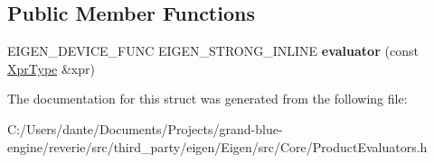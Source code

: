 \subsection*{Public Member Functions}
\begin{DoxyCompactItemize}
\item 
\mbox{\label{struct_eigen_1_1internal_1_1evaluator_3_01_diagonal_3_01const_01_product_3_01_lhs_00_01_rhs_00_0f2daf8d0d705abfd9eae463424f3e8d5_a5166c36f631879f1bd4ace35a8e40429}} 
E\+I\+G\+E\+N\+\_\+\+D\+E\+V\+I\+C\+E\+\_\+\+F\+U\+NC E\+I\+G\+E\+N\+\_\+\+S\+T\+R\+O\+N\+G\+\_\+\+I\+N\+L\+I\+NE {\bfseries evaluator} (const \mbox{\hyperlink{class_eigen_1_1_diagonal}{Xpr\+Type}} \&xpr)
\end{DoxyCompactItemize}


The documentation for this struct was generated from the following file\+:\begin{DoxyCompactItemize}
\item 
C\+:/\+Users/dante/\+Documents/\+Projects/grand-\/blue-\/engine/reverie/src/third\+\_\+party/eigen/\+Eigen/src/\+Core/Product\+Evaluators.\+h\end{DoxyCompactItemize}
